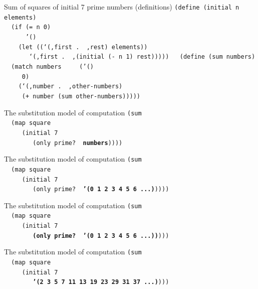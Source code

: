 \documentclass{beamer}
\begin{document}
\begin{frame}{Sum of squares of initial 7 prime numbers (definitions)} \pause
  \texttt{(define (initial n elements)\\ \pause
    \ \ (if (= n 0)\\
    \ \ \ \ \ \ '()\\ \pause
    \ \ \ \ (let ((`(,first .\,\,,rest) elements))\\
    \ \ \ \ \ \ \ `(,first .\,\,,(initial (- n 1) rest)))))\\
    \ \\ \pause
    (define (sum numbers)\\ \pause
    \ \ (match numbers\\ \pause
    \ \ \ \ ('()\\
    \ \ \ \ \ 0)\\ \pause
    \ \ \ \ (`(,number .\,\,,other-numbers)\\
    \ \ \ \ \ (+ number (sum other-numbers)))))
  }
\end{frame}

\begin{frame}{The substitution model of computation}
  \texttt{(sum \\
    \ \ (map square \\
    \ \ \ \ \ (initial 7\\
    \ \ \ \ \ \ \ \ (only prime?\,\,\textbf{numbers}))))}
\end{frame}

\begin{frame}{The substitution model of computation}
  \texttt{(sum \\
    \ \ (map square \\
    \ \ \ \ \ (initial 7\\
    \ \ \ \ \ \ \ \ (only prime?\,\,\textbf{'(0 1 2 3 4 5 6 ...)}))))}
\end{frame}

\begin{frame}{The substitution model of computation}
  \texttt{(sum \\
    \ \ (map square \\
    \ \ \ \ \ (initial 7\\
    \ \ \ \ \ \ \ \ \textbf{(only prime?\,\,'(0 1 2 3 4 5 6 ...))})))}
\end{frame}

\begin{frame}{The substitution model of computation}
  \texttt{(sum \\
    \ \ (map square \\
    \ \ \ \ \ (initial 7\\
    \ \ \ \ \ \ \ \ \textbf{'(2 3 5 7 11 13 19 23 29 31 37 ...)})))}
\end{frame}
\end{document}
